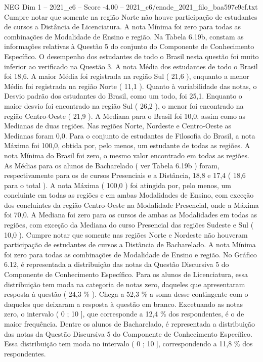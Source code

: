 \begin{textsample}{NEG Dim 1 – 2021\_c6 – Score -4.00 – 2021\_c6/enade\_2021\_filo\_baa597e9cf.txt}
Cumpre notar que somente na região Norte não houve participação de estudantes de cursos a Distância de Licenciatura.
A nota Mínima foi zero para todas as combinações de Modalidade de Ensino e região.
Na Tabela 6.19b, constam as informações relativas à Questão 5 do conjunto do Componente de Conhecimento Específico.
O desempenho dos estudantes de todo o Brasil nesta questão foi muito inferior ao verificado na Questão 3.
A nota Média dos estudantes de todo o Brasil foi 18,6.
A maior Média foi registrada na região Sul ( 21,6 ), enquanto a menor Média foi registrada na região Norte ( 11,1 ).
Quanto à variabilidade das notas, o Desvio padrão dos estudantes do Brasil, como um todo, foi 25,1.
Enquanto o maior desvio foi encontrado na região Sul ( 26,2 ), o menor foi encontrado na região Centro-Oeste ( 21,9 ).
A Mediana para o Brasil foi 10,0, assim como as Medianas de duas regiões.
Nas regiões Norte, Nordeste e Centro-Oeste as Medianas foram 0,0.
Para o conjunto de estudantes de Filosofia do Brasil, a nota Máxima foi 100,0, obtida por, pelo menos, um estudante de todas as regiões.
A nota Mínima do Brasil foi zero, o mesmo valor encontrado em todas as regiões.
As Médias para os alunos de Bacharelado ( ver Tabela 6.19b ) foram, respectivamente para os de cursos Presenciais e a Distância, 18,8 e 17,4 ( 18,6 para o total ).
A nota Máxima ( 100,0 ) foi atingida por, pelo menos, um concluinte em todas as regiões e em ambas Modalidades de Ensino, com exceção dos concluintes da região Centro-Oeste na Modalidade Presencial, onde a Máxima foi 70,0.
A Mediana foi zero para os cursos de ambas as Modalidades em todas as regiões, com exceção da Mediana do curso Presencial das regiões Sudeste e Sul ( 10,0 ).
Cumpre notar que somente nas regiões Norte e Nordeste não houveram participação de estudantes de cursos a Distância de Bacharelado.
A nota Mínima foi zero para todas as combinações de Modalidade de Ensino e região.
No Gráfico 6.12, é representada a distribuição das notas da Questão Discursiva 5 do Componente de Conhecimento Específico.
Para os alunos de Licenciatura, essa distribuição tem moda na categoria de notas zero, daqueles que apresentaram resposta à questão ( 24,3 \% ).
Chega a 52,3 \% a soma desse contingente com o daqueles que deixaram a resposta à questão em branco.
Excetuando as notas zero, o intervalo ( 0 ; 10 ], que corresponde a 12,4 \% dos respondentes, é o de maior frequência.
Dentre os alunos de Bacharelado, é representada a distribuição das notas da Questão Discursiva 5 do Componente de Conhecimento Específico.
Essa distribuição tem moda no intervalo ( 0 ; 10 ], correspondendo a 11,8 \% dos respondentes.

\end{textsample}
